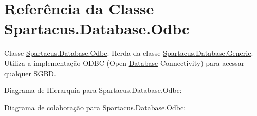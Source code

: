 \hypertarget{classSpartacus_1_1Database_1_1Odbc}{\section{Referência da Classe Spartacus.\+Database.\+Odbc}
\label{classSpartacus_1_1Database_1_1Odbc}
}


Classe \hyperlink{classSpartacus_1_1Database_1_1Odbc}{Spartacus.\+Database.\+Odbc}. Herda da classe \hyperlink{classSpartacus_1_1Database_1_1Generic}{Spartacus.\+Database.\+Generic}. Utiliza a implementação O\+D\+B\+C (Open \hyperlink{namespaceSpartacus_1_1Database}{Database} Connectivity) para acessar qualquer S\+G\+B\+D.  




Diagrama de Hierarquia para Spartacus.\+Database.\+Odbc\+:


Diagrama de colaboração para Spartacus.\+Database.\+Odbc\+:
